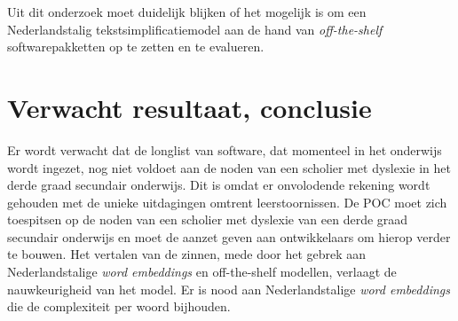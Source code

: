 Uit dit onderzoek moet duidelijk blijken of het mogelijk is om een Nederlandstalig tekstsimplificatiemodel aan de hand van \textit{off-the-shelf} softwarepakketten op te zetten en te evalueren.



\section{Verwacht resultaat, conclusie}
\label{sec:verwachte_resultaten}

Er wordt verwacht dat de longlist van software, dat momenteel in het onderwijs wordt ingezet, nog niet voldoet aan de noden van een scholier met dyslexie in het derde graad secundair onderwijs. Dit is omdat er onvolodende rekening wordt gehouden met de unieke uitdagingen omtrent leerstoornissen. De POC moet zich toespitsen op de noden van een scholier met dyslexie van een derde graad secundair onderwijs en moet de aanzet geven aan ontwikkelaars om hierop verder te bouwen. Het vertalen van de zinnen, mede door het gebrek aan Nederlandstalige \textit{word embeddings} en off-the-shelf modellen, verlaagt de nauwkeurigheid van het model. Er is nood aan Nederlandstalige \textit{word embeddings} die de complexiteit per woord bijhouden. 

